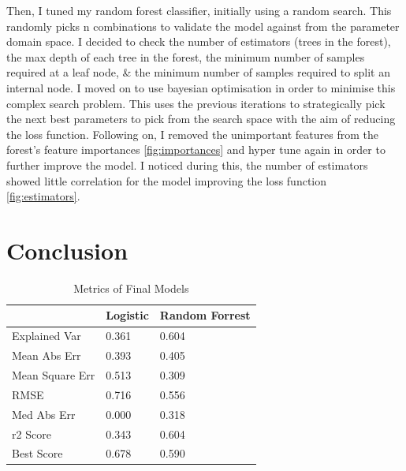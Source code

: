 \documentclass[11pt, a4paper, twocolumn]{article}
\begin{document}
Then, I tuned my random forest classifier, initially using a random search. This randomly picks n combinations to validate the model against from the parameter domain space.
I decided to check the number of estimators (trees in the forest), the max depth of each tree in the forest, the minimum number of samples required at a leaf node, \& the minimum number of samples required to split an internal node.
I moved on to use bayesian optimisation in order to minimise this complex search problem. This uses the previous iterations to strategically pick the next best parameters to pick from the search space with the aim of reducing the loss function. 
Following on, I removed the unimportant features from the forest's feature importances \ref{fig:importances} and hyper tune again in order to further improve the model. I noticed during this, the number of estimators showed little correlation for the model improving the loss function \ref{fig:estimators}.  

\section{Conclusion}

\begin{table}[H]
	\centering
	\begin{tabular}{l|l|l|}
	\cline{2-3}
												   & Logistic & Random Forrest \\ \hline
	\multicolumn{1}{|l|}{Explained Var} 		   & 0.361                     & 0.604                           \\ \hline
	\multicolumn{1}{|l|}{Mean Abs Err}       	   & 0.393                     & 0.405                           \\ \hline
	\multicolumn{1}{|l|}{Mean Square Err}          & 0.513                     & 0.309                           \\ \hline
	\multicolumn{1}{|l|}{RMSE}   				   & 0.716                     & 0.556                           \\ \hline
	\multicolumn{1}{|l|}{Med Abs Err}    		   & 0.000                     & 0.318                           \\ \hline
	\multicolumn{1}{|l|}{r2 Score}                 & 0.343                     & 0.604                           \\ \hline
	\multicolumn{1}{|l|}{Best Score}               & 0.678                     & 0.590                           \\ \hline
	\end{tabular}
	\caption{Metrics of Final Models}
	\label{table:metrics}
\end{table}
\end{document}
